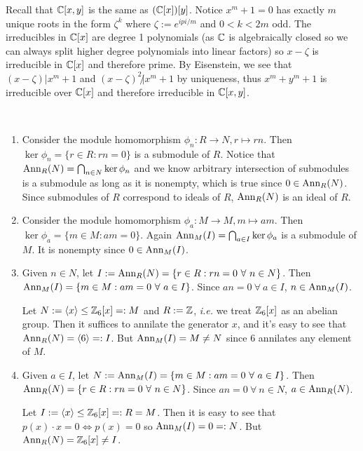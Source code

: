 \documentclass[12pt]{article}
\begin{document}
\begin{problem}[6]
	Recall that $ \mathbb{C}[x,y]$ is the same as $ (\mathbb{C}[x])[y]$. Notice $ x^{m}+1 = 0$ has exactly $ m$ unique roots in the form  $ \zeta^{k}$ where $ \zeta:= e^{i pi /m}$ and $ 0<k<2m$ odd. The irreducibles in $ \mathbb{C}[x]$ are degree 1 polynomials (as $ \mathbb{C}$ is algebraically closed so we can always split higher degree polynomials into linear factors) so $ x -\zeta$ is irreducible in $ \mathbb{C}[x]$ and therefore prime. By Eisenstein, we see that $ (x-\zeta)|x^{m}+1$ and $ (x-\zeta)^2 \not | x^{m}+1$ by uniqueness, thus $ x^{m}+y^{m}+1$ is irreducible over $ \mathbb{C}[x]$ and therefore irreducible in $ \mathbb{C}[x,y]$.
\end{problem}

\begin{problem}[7]
~\begin{enumerate}[label=(\alph*)]
	\item Consider the module homomorphism $ \phi_n: R \to N, r \mapsto rn$. Then $ \ker \phi_n = \{r \in R: rn=0\} $ is a submodule of $ R$. Notice that $\operatorname{Ann}_{ R}( N) = \bigcap_{ n \in N} \ker \phi_n$ and we know arbitrary intersection of submodules is a submodule as long as it is nonempty, which is true since $ 0 \in \operatorname{Ann}_{ R}( N) $. Since  submodules of $ R$ correspond to ideals of  $ R$,  $ \operatorname{Ann}_{ R}( N) $ is an ideal of $ R$.
	\item Consider the module homomorphism $ \phi_a: M \to M, m \mapsto am$. Then $ \ker \phi_a = \{m \in M: am=0 \} $. Again $ \operatorname{Ann}_{ M}( I) = \bigcap_{ a \in I} \ker \phi_a $ is a submodule of $ M$. It is nonempty since $ 0 \in \operatorname{Ann}_{ M}( I) $.
	\item Given $ n \in N$, let $ I:= \Ann_{ R}( N) = \{r \in R: rn=0 \ \forall \ n \in N\}  $. Then $ \operatorname{Ann}_{M}( I) = \{m \in M: am=0 \ \forall \ a \in I\}$. Since $ an=0 \ \forall \ a \in I$, $  n \in \operatorname{Ann}_{ M}( I)$.

		Let $ N := \langle x \rangle \leq \mathbb{Z}_6[x]=:M$ and $ R:= \mathbb{Z}$, \emph{i.e.} we treat $ \mathbb{Z}_6[x]$ as an abelian group. Then it suffices to annilate the generator $ x$, and it's easy to see that $ \operatorname{Ann}_{ R}( N) = \langle 6 \rangle =:I$. But $ \operatorname{Ann}_{ M}( I) = M \neq N$ since $ 6$ annilates any element of  $ M$.
	\item Given $ a \in I$, let $ N:= \Ann_{ M}( I) = \{m \in M: am=0 \ \forall \ a \in I\}  $. Then $ \operatorname{Ann}_{ R}( N) = \{r \in R: rn=0 \ \forall \ n \in N \}$. Since $ an = 0 \ \forall \ n \in N$, $ a \in \operatorname{Ann}_{ R}( N) $.

		Let $ I := \langle x \rangle \leq \mathbb{Z}_6[x]=:R=M$. Then it is easy to see that $ p(x) \cdot x = 0 \iff p(x)=0$ so $ \operatorname{Ann}_{ M}( I) = 0 =:N$. But $ \operatorname{Ann}_{ R}( N) = \mathbb{Z}_6[x] \neq I$.
\end{enumerate}
\end{problem}
\end{document}

